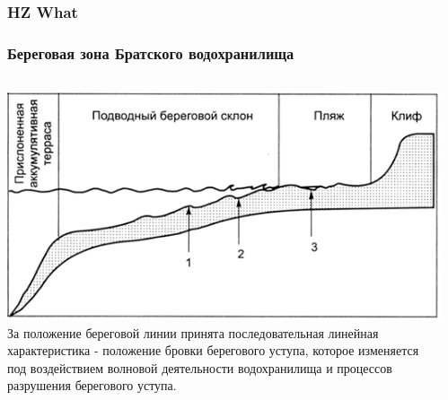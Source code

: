 \documentclass[10pt]{beamer}
\begin{document}
\begin{frame}
  \frametitle{HZ What}
\end{frame}

\begin{frame}[fragile]
  \frametitle{Береговая зона Братского водохранилища}
  \begin{columns}
    \begin{column}{0.5\linewidth}
      \includegraphics[width=\linewidth]{shore-struct-base.png}
      За положение береговой линии
принята последовательная линейная характеристика - положение бровки берегового уступа,  которое изменяется под воздействием волновой деятельности водохранилища и процессов разрушения берегового уступа.
    \end{column}
    \begin{column}{0.5\linewidth}

\end{column}
\end{columns}
\end{frame}
\end{document}
